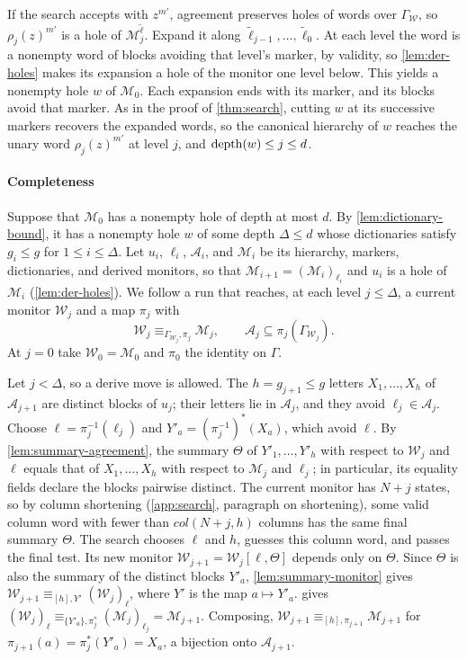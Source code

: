 If the search accepts with $z^{m'}$, agreement preserves holes of words over
$\Gamma_{\mathcal W}$, so $\rho_j(z)^{m'}$ is a hole of
$\mathcal M^{\widetilde{\boldsymbol\ell}}_j$. Expand it along
$\widetilde\ell_{j-1},\ldots,\widetilde\ell_0$. At each level the word is a
nonempty word of blocks avoiding that level's marker, by validity, so
\cref{lem:der-holes} makes its expansion a hole of the monitor one level
below. This yields a nonempty hole $w$ of $\mathcal M_0$. Each expansion ends
with its marker, and its blocks avoid that marker. As in the proof of
\cref{thm:search}, cutting $w$ at its successive markers recovers the
expanded words, so the canonical hierarchy of $w$ reaches the unary word
$\rho_j(z)^{m'}$ at level $j$, and $\operatorname{depth}(w)\le j\le d$.

\paragraph{Completeness}
Suppose that $\mathcal M_0$ has a nonempty hole of depth at most $d$. By
\cref{lem:dictionary-bound}, it has a nonempty hole $w$ of some depth
$\Delta\le d$ whose dictionaries satisfy $g_i\le g$ for $1\le i\le\Delta$. Let $u_i$,
$\ell_i$, $\mathcal A_i$, and $\mathcal M_i$ be its hierarchy, markers,
dictionaries, and derived monitors, so that $\mathcal M_{i+1}=(\mathcal
M_i)_{\ell_i}$ and $u_i$ is a hole of $\mathcal M_i$ (\cref{lem:der-holes}).
We follow a run that reaches, at each level $j\le\Delta$, a current monitor
$\mathcal W_j$ and a map $\pi_j$ with
\[
 \mathcal W_j\equiv_{\Gamma_{\mathcal W_j},\pi_j}\mathcal M_j,\qquad
 \mathcal A_j\subseteq\pi_j(\Gamma_{\mathcal W_j}).
\]
At $j=0$ take $\mathcal W_0=\mathcal M_0$ and $\pi_0$ the identity on
$\Gamma$.

Let $j<\Delta$, so a derive move is allowed. The $h=g_{j+1}\le g$ letters
$X_1,\ldots,X_h$ of $\mathcal A_{j+1}$ are distinct blocks of $u_j$; their
letters lie in $\mathcal A_j$, and they avoid $\ell_j\in\mathcal A_j$.
Choose $\ell=\pi_j^{-1}(\ell_j)$ and $Y'_a=(\pi_j^{-1})^*(X_a)$, which avoid
$\ell$. By \cref{lem:summary-agreement}, the summary $\Theta$ of
$Y'_1,\ldots,Y'_h$ with respect to $\mathcal W_j$ and $\ell$ equals that of
$X_1,\ldots,X_h$ with respect to $\mathcal M_j$ and $\ell_j$; in particular,
its equality fields declare the blocks pairwise distinct. The current
monitor has $N+j$ states, so by column shortening (\cref{app:search},
paragraph on shortening), some valid column word with fewer than
$\mathit{col}(N+j,h)$ columns has the same final summary $\Theta$. The
search chooses $\ell$ and $h$, guesses this column word, and passes the final
test. Its new monitor $\mathcal W_{j+1}=\mathcal W_j[\ell,\Theta]$ depends
only on $\Theta$. Since $\Theta$ is also the summary of the distinct blocks
$Y'_a$, \cref{lem:summary-monitor} gives
$\mathcal W_{j+1}\equiv_{[h],Y'}(\mathcal W_j)_\ell$, where $Y'$ is the map
$a\mapsto Y'_a$.  gives
$(\mathcal W_j)_\ell\equiv_{\{Y'_a\},\pi_j^*}(\mathcal M_j)_{\ell_j}
=\mathcal M_{j+1}$. Composing, $\mathcal W_{j+1}\equiv_{[h],\pi_{j+1}}\mathcal
M_{j+1}$ for $\pi_{j+1}(a)=\pi_j^*(Y'_a)=X_a$, a bijection onto
$\mathcal A_{j+1}$.

